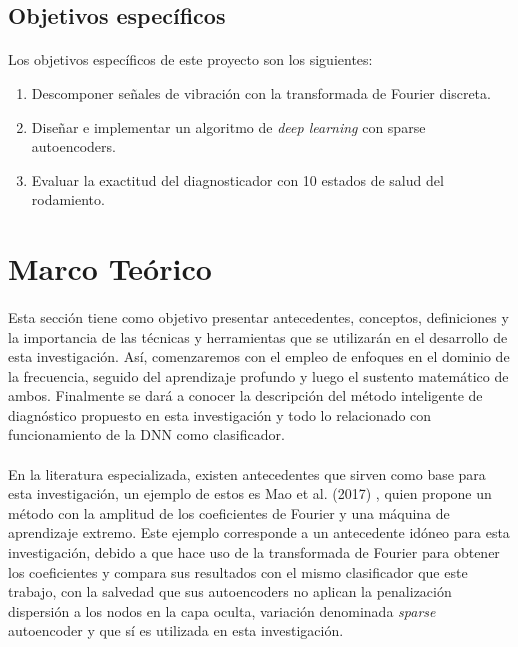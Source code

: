 \documentclass[12pt]{article}
\begin{document}
\subsection{Objetivos específicos}
\paragraph{}
Los objetivos específicos de este proyecto son los siguientes:
\begin{enumerate}
\item{Descomponer señales de vibración con la transformada de Fourier discreta.}
\item{Diseñar e implementar un algoritmo de \textit{deep learning} con sparse autoencoders.}
\item{Evaluar la exactitud del diagnosticador con 10 estados de salud del rodamiento.}
\end{enumerate}

\section{Marco Teórico}
\paragraph{}
Esta sección tiene como objetivo presentar antecedentes, conceptos, definiciones y la importancia de las técnicas y herramientas que se utilizarán en el desarrollo de esta investigación. Así, comenzaremos con el empleo de enfoques en el dominio de la frecuencia, seguido del aprendizaje profundo y luego el sustento matemático de ambos. Finalmente se dará a conocer la descripción del método inteligente de diagnóstico propuesto en esta investigación y todo lo relacionado con funcionamiento de la DNN como clasificador.

\paragraph{}
En la literatura especializada, existen antecedentes que sirven como base para esta investigación, un ejemplo de estos es Mao et al. (2017) \cite{mao}, quien propone un método con la amplitud de los coeficientes de Fourier y una máquina de aprendizaje extremo. Este ejemplo corresponde a un  antecedente idóneo para esta investigación, debido a que hace uso de la transformada de Fourier para obtener los coeficientes y compara sus resultados con el mismo clasificador que este trabajo, con la salvedad que sus autoencoders no aplican la penalización dispersión a los nodos en la capa oculta, variación denominada \textit{sparse} autoencoder y que sí es utilizada en esta investigación.
\end{document}
